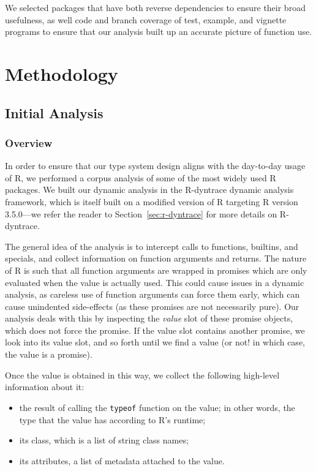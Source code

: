 \documentclass[acmsmall,review,anonymous]{acmart}\settopmatter{printfolios=true,printccs=false,printacmref=false}
\begin{document}
We selected packages that have both  reverse dependencies to ensure their broad usefulness, as well  code and branch coverage of test, example, and vignette programs to ensure that our analysis built up an accurate picture of function use.


%
%
%
%
%
%
\section{Methodology}

%
%
%
%
\subsection{Initial Analysis}

%
%
\subsubsection{Overview}

In order to ensure that our type system design aligns with the day-to-day usage of R, we performed a corpus analysis of some of the most widely used R packages.
We built our dynamic analysis in the R-dyntrace  dynamic analysis framework, which is itself built on a modified version of R targeting R version 3.5.0---we refer the reader to Section~\ref{sec:r-dyntrace} for more details on R-dyntrace.

The general idea of the analysis is to intercept calls to functions, builtins, and specials, and collect information on function arguments and returns.
The nature of R is such that all function arguments are wrapped in promises which are only evaluated when the value is actually used.
This could cause issues in a dynamic analysis, as careless use of function arguments can force them early, which can cause unindented side-effects (as these promises are not necessarily pure).
Our analysis deals with this by inspecting the {\it value} slot of these promise objects, which does not force the promise. 
If the value slot contains another promise, we look into its value slot, and so forth until we find a value (or not! in which case, the value is a promise).

Once the value is obtained in this way, we collect the following high-level information about it:

\begin{itemize}
\item the result of calling the {\tt typeof} function on the value; in other words, the type that the value has according to R's runtime;
\item its class, which is a list of string class names;
\item its attributes, a list of metadata attached to the value.
\end{itemize}
\end{document}
